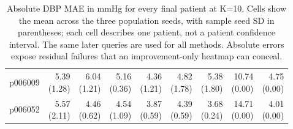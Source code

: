 \documentclass[11pt]{article}
\begin{document}
\begin{table}[!htbp]
\begin{tabular}{lrrrrrrrr}
p006009 & \shortstack{5.39\\(1.28)} & \shortstack{6.04\\(1.21)} & \shortstack{5.16\\(0.36)} & \shortstack{4.36\\(1.21)} & \shortstack{4.82\\(1.78)} & \shortstack{5.38\\(1.80)} & \shortstack{10.74\\(0.00)} & \shortstack{4.75\\(0.00)}\\
p006052 & \shortstack{5.57\\(2.11)} & \shortstack{4.46\\(0.62)} & \shortstack{4.54\\(1.09)} & \shortstack{3.87\\(0.59)} & \shortstack{4.39\\(0.59)} & \shortstack{3.68\\(0.24)} & \shortstack{14.71\\(0.00)} & \shortstack{4.01\\(0.00)}\\
\bottomrule\end{tabular}
\caption{Absolute DBP MAE in mmHg for every final patient at K=10. Cells show the mean across the three population seeds, with sample seed SD in parentheses; each cell describes one patient, not a patient confidence interval. The same later queries are used for all methods. Absolute errors expose residual failures that an improvement-only heatmap can conceal.}\end{table}
\end{document}
